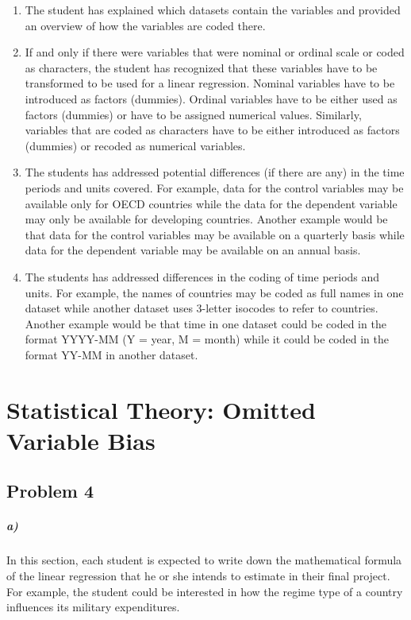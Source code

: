 \documentclass[12pt]{article}\usepackage[]{graphicx}\usepackage[]{color}
\begin{document}
\begin{enumerate}
	\item The student has explained which datasets contain the variables and provided an overview of how the variables are coded there.
	\item If and only if there were variables that were nominal or ordinal scale or coded as characters, the student has recognized that these variables have to be transformed to be used for a linear regression. Nominal variables have to be introduced as factors (dummies). Ordinal variables have to be either used as factors (dummies) or have to be assigned numerical values. Similarly, variables that are coded as characters have to be either introduced as factors (dummies) or recoded as numerical variables.
	\item The students has addressed potential differences (if there are any) in the time periods and units covered. For example, data for the control variables may be available only for OECD countries while the data for the dependent variable may only be available for developing countries. Another example would be that data for the control variables may be available on a quarterly basis while data for the dependent variable may be available on an annual basis.
	\item The students has addressed differences in the coding of time periods and units. For example, the names of countries may be coded as full names in one dataset while another dataset uses 3-letter isocodes to refer to countries. Another example would be that time in one dataset could be coded in the format YYYY-MM (Y = year, M = month) while it could be coded in the format YY-MM in another dataset.
\end{enumerate}



\section*{Statistical Theory: Omitted Variable Bias}

\subsection*{Problem 4}

\subparagraph{a)} In this section, each student is expected to write down the mathematical formula of the linear regression that he or she intends to estimate in their final project. For example, the student could be interested in how the regime type of a country influences its military expenditures.
\end{document}
